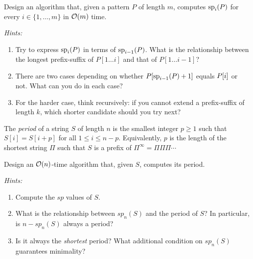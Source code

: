 \begin{exercise}
  Design an algorithm that, given a pattern $P$ of length $m$, computes
  $\mathrm{sp}_{i}(P)$ for every $i \in \{1, \ldots, m\}$ in $\mathcal{O}\!\left(m\right)$ time.

  \medskip
  \textit{Hints:}
  \begin{enumerate}
    \item Try to express $\mathrm{sp}_{i}(P)$ in terms of $\mathrm{sp}_{i-1}(P)$.
          What is the relationship between the longest prefix-suffix of
          $P[1\ldots i]$ and that of $P[1\ldots i-1]$?
    \item There are two cases depending on whether $P[\mathrm{sp}_{i-1}(P)+1]$ equals
          $P\kern0pt[i]$ or not. What can you do in each case?
    \item For the harder case, think recursively: if you cannot extend
          a prefix-suffix of length $k$, which shorter candidate should
          you try next?
  \end{enumerate}
\end{exercise}

\begin{exercise}
  The \emph{period} of a string $S$ of length $n$ is the smallest integer $p \geq 1$
  such that $S[i] = S[i+p]$ for all $1 \leq i \leq n - p$.
  Equivalently, $p$ is the length of the shortest string $\Pi$ such that $S$ is a
  prefix of $\Pi^{\infty} = \Pi\Pi\Pi\cdots$

  Design an $\mathcal{O}\!\left(n\right)$-time algorithm that, given $S$, computes its period.

  \medskip
  \textit{Hints:}
  \begin{enumerate}
    \item Compute the $sp$ values of $S$.
    \item What is the relationship between $sp_n(S)$ and the period of $S$?
          In particular, is $n - sp_n(S)$ always a period?
    \item Is it always the \emph{shortest} period?  What additional condition on
          $sp_n(S)$ guarantees minimality?
  \end{enumerate}
\end{exercise}

